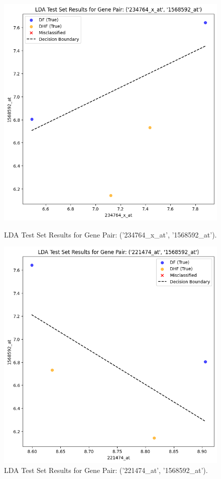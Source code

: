 \documentclass[final]{article}
\begin{document}
        \begin{figure}[H]
            \centering
            \begin{minipage}{0.45\textwidth}
                \includegraphics[width=\textwidth]{234764_x_at, 1568592_at.png}
                \caption{LDA Test Set Results for Gene Pair: ('234764\_x\_at', '1568592\_at').}
            \end{minipage}
            \hfill
            \begin{minipage}{0.45\textwidth}
                \includegraphics[width=\textwidth]{221474_at, 1568592_at.png}
                \caption{LDA Test Set Results for Gene Pair: ('221474\_at', '1568592\_at').}
            \end{minipage}
        \end{figure}
\end{document}
